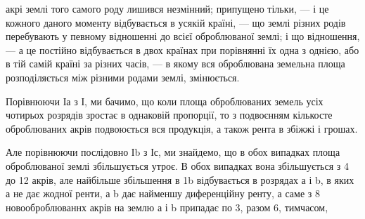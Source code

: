 акрі землі того самого роду лишився незмінний; припущено тільки, — і це кожного
даного моменту відбувається в усякій країні, — що землі різних родів перебувають
у певному відношенні до всієї оброблюваної землі; і що відношення, — а це постійно
відбувається в двох країнах при порівнянні їх одна з однією, або в тій самій
країні за різних часів, — в якому вся оброблювана земельна площа розподіляється
між різними родами землі, змінюється.

Порівнюючи Іа з І, ми бачимо, що коли площа оброблюваних земель усіх
чотирьох розрядів зростає в однаковій пропорції, то з подвоєнням кількосте
оброблюваних акрів подвоюється вся продукція, а також рента в збіжжі і грошах.

Але порівнюючи послідовно Іb з Іс, ми знайдемо, що в обох випадках площа
оброблюваної землі збільшується утроє. В обох випадках вона збільшується з
4 до 12 акрів, але
найбільше збільшення
в 1b відбувається
в розрядах
а і b, в яких
а не дає жодної
ренти, а b дає найменшу
диференційну
ренту, а саме
з 8 новооброблюваннх
акрів
на землю а і b
припадає по 3, разом
6, тимчасом,

